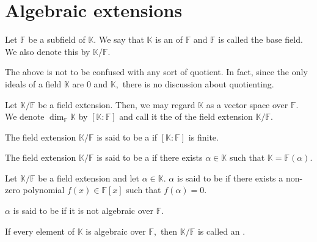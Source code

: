 \chapter{Algebraic extensions}

\begin{defn}%
    Let $\mathbb{F}$ be a subfield of $\mathbb{K}.$ We say that $\mathbb{K}$ is an  of $\mathbb{F}$ and $\mathbb{F}$ is called the base field. We also denote this by $\mathbb{K}/\mathbb{F}.$
\end{defn}

\begin{rem}
    The above is not to be confused with any sort of quotient. In fact, since the only ideals of a field $\mathbb{K}$ are $0$ and $\mathbb{K},$ there is no discussion about quotienting.
\end{rem}

\begin{defn}%
    Let $\mathbb{K}/\mathbb{F}$ be a field extension. Then, we may regard $\mathbb{K}$ as a vector space over $\mathbb{F}.$ We denote $\dim_{\mathbb{F}}\mathbb{K}$ by $[\mathbb{K} : \mathbb{F}]$ and call it the  of the field extension $\mathbb{K}/\mathbb{F}.$
\end{defn}

\begin{defn}%
    The field extension $\mathbb{K}/\mathbb{F}$ is said to be a  if $[\mathbb{K} : \mathbb{F}]$ is finite. 
\end{defn}

\begin{defn}%
    The field extension $\mathbb{K}/\mathbb{F}$ is said to be a  if there exists $\alpha \in \mathbb{K}$ such that $\mathbb{K} = \mathbb{F}(\alpha).$
\end{defn}

\begin{defn}
    Let $\mathbb{K}/\mathbb{F}$ be a field extension and let $\alpha \in \mathbb{K}.$ $\alpha$ is said to be  if there exists a non-zero polynomial $f(x) \in \mathbb{F}[x]$ such that $f(\alpha) = 0.$

    $\alpha$ is said to be  if it is not algebraic over $\mathbb{F}.$

    If every element of $\mathbb{K}$ is algebraic over $\mathbb{F},$ then $\mathbb{K}/\mathbb{F}$ is called an .
\end{defn}

